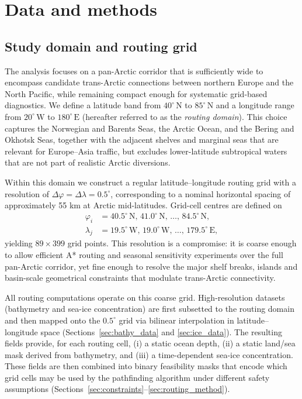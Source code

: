 \section{Data and methods}\label{sec:methods}

\subsection{Study domain and routing grid}
\label{sec:domain_grid}

The analysis focuses on a pan-Arctic corridor that is sufficiently wide
to encompass candidate trans-Arctic connections between northern Europe
and the North Pacific, while remaining compact enough for systematic
grid-based diagnostics. We define a latitude band from
$40^{\circ}\,\mathrm{N}$ to $85^{\circ}\,\mathrm{N}$ and a longitude range
from $20^{\circ}\,\mathrm{W}$ to $180^{\circ}\,\mathrm{E}$ (hereafter
referred to as the \emph{routing domain}). This choice captures the
Norwegian and Barents Seas, the Arctic Ocean, and the Bering and
Okhotsk Seas, together with the adjacent shelves and marginal seas that
are relevant for Europe--Asia traffic, but excludes lower-latitude
subtropical waters that are not part of realistic Arctic diversions.

Within this domain we construct a regular latitude--longitude routing
grid with a resolution of $\Delta\varphi=\Delta\lambda=0.5^{\circ}$,
corresponding to a nominal horizontal spacing of approximately 55 km at Arctic mid-latitudes. Grid-cell centres
are defined on
\begin{align*}
  \varphi_i &= 40.5^{\circ}\,\mathrm{N},\, 41.0^{\circ}\,\mathrm{N},\,\dots,\,84.5^{\circ}\,\mathrm{N}, \\
  \lambda_j &= 19.5^{\circ}\,\mathrm{W},\, 19.0^{\circ}\,\mathrm{W},\,\dots,\,179.5^{\circ}\,\mathrm{E},
\end{align*}
yielding $89 \times 399$ grid points. This resolution is a compromise:
it is coarse enough to allow efficient A* routing and seasonal
sensitivity experiments over the full pan-Arctic corridor, yet fine
enough to resolve the major shelf breaks, islands and basin-scale
geometrical constraints that modulate trans-Arctic connectivity.

All routing computations operate on this coarse grid. High-resolution
datasets (bathymetry and sea-ice concentration) are first subsetted to
the routing domain and then mapped onto the $0.5^{\circ}$ grid via
bilinear interpolation in latitude--longitude space
(Sections~\ref{sec:bathy_data} and \ref{sec:ice_data}). The resulting
fields provide, for each routing cell, (i) a static ocean depth,
(ii) a static land/sea mask derived from bathymetry, and (iii) a
time-dependent sea-ice concentration. These fields are then combined
into binary feasibility masks that encode which grid cells may be used
by the pathfinding algorithm under different safety assumptions
(Sections~\ref{sec:constraints}--\ref{sec:routing_method}).


